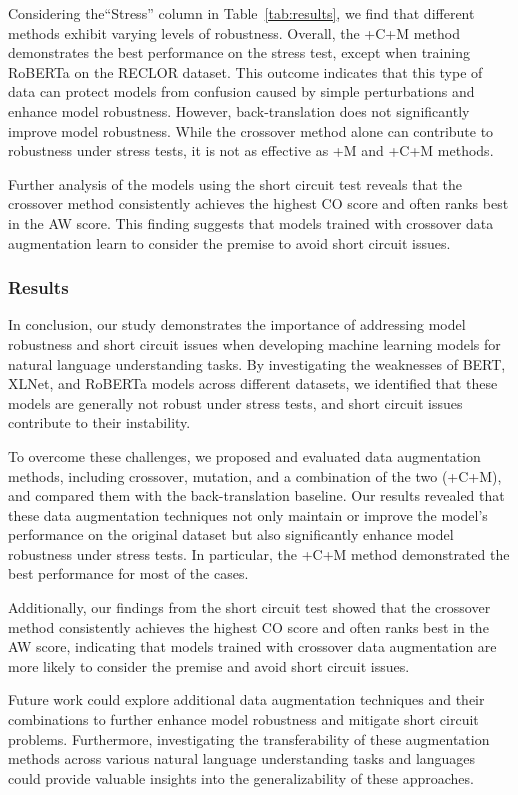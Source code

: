 Considering the``Stress'' column in Table~\ref{tab:results}, we find that different methods exhibit varying levels of robustness. Overall, the +C+M method demonstrates the best performance on the stress test, except when training RoBERTa on the RECLOR dataset. This outcome indicates that this type of data can protect models from confusion caused by simple perturbations and enhance model robustness. However, back-translation does not significantly improve model robustness. While the crossover method alone can contribute to robustness under stress tests, it is not as effective as +M and +C+M methods.

Further analysis of the models using the short circuit test reveals that the crossover method consistently achieves the highest CO score and often ranks best in the AW score. This finding suggests that models trained with crossover data augmentation learn to consider the premise to avoid short circuit issues.

\subsubsection{Results}
In conclusion, our study demonstrates the importance of addressing model robustness and short circuit issues when developing machine learning models for natural language understanding tasks. By investigating the weaknesses of BERT, XLNet, and RoBERTa models across different datasets, we identified that these models are generally not robust under stress tests, and short circuit issues contribute to their instability.

To overcome these challenges, we proposed and evaluated data augmentation methods, including crossover, mutation, and a combination of the two (+C+M), and compared them with the back-translation baseline. Our results revealed that these data augmentation techniques not only maintain or improve the model's performance on the original dataset but also significantly enhance model robustness under stress tests. In particular, the +C+M method demonstrated the best performance for most of the cases.

Additionally, our findings from the short circuit test showed that the crossover method consistently achieves the highest CO score and often ranks best in the AW score, indicating that models trained with crossover data augmentation are more likely to consider the premise and avoid short circuit issues.

Future work could explore additional data augmentation techniques and their combinations to further enhance model robustness and mitigate short circuit problems. Furthermore, investigating the transferability of these augmentation methods across various natural language understanding tasks and languages could provide valuable insights into the generalizability of these approaches.


